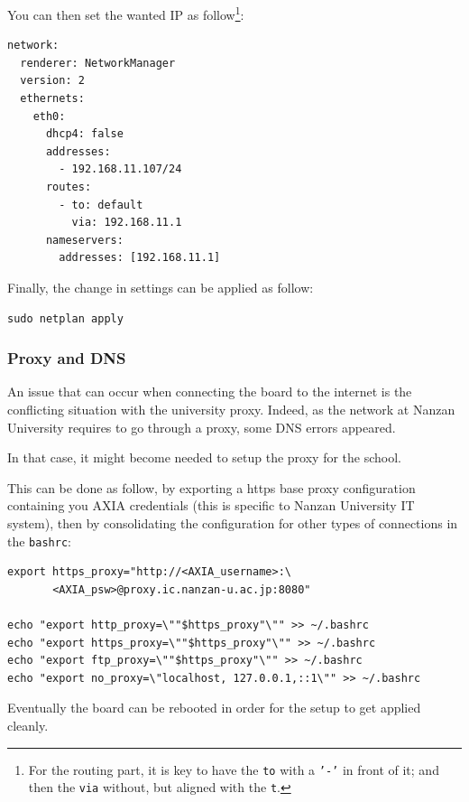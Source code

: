 \documentclass[10pt]{article}
\begin{document}
You can then set the wanted IP as follow\footnote{For the routing part, it is key to have the \texttt{to} with a \texttt{'-'} in front of
it; and then the \texttt{via} without, but aligned with the \texttt{t}.}:
\begin{verbatim}
network:
  renderer: NetworkManager
  version: 2
  ethernets:
    eth0:
      dhcp4: false
      addresses:
        - 192.168.11.107/24
      routes:
        - to: default
          via: 192.168.11.1
      nameservers:
        addresses: [192.168.11.1]
\end{verbatim}

Finally, the change in settings can be applied
as follow:

\begin{verbatim}
sudo netplan apply
\end{verbatim}

\subsubsection{Proxy and DNS}
\label{sec:org140ac9e}
An issue that can occur when connecting the board to the internet is the
conflicting situation with the university proxy.
Indeed, as the network at Nanzan University requires to go through a proxy,
some DNS errors appeared.

In that case, it might become needed to setup the proxy for the school.

This can be done as follow, by exporting a https base proxy configuration
containing you AXIA credentials (this is specific to Nanzan University IT system),
then by consolidating the configuration for other types of connections in the \texttt{bashrc}:

\begin{verbatim}
export https_proxy="http://<AXIA_username>:\
       <AXIA_psw>@proxy.ic.nanzan-u.ac.jp:8080"

echo "export http_proxy=\""$https_proxy"\"" >> ~/.bashrc
echo "export https_proxy=\""$https_proxy"\"" >> ~/.bashrc
echo "export ftp_proxy=\""$https_proxy"\"" >> ~/.bashrc
echo "export no_proxy=\"localhost, 127.0.0.1,::1\"" >> ~/.bashrc
\end{verbatim}

Eventually the board can be rebooted in order for the setup to get applied cleanly.
\end{document}
